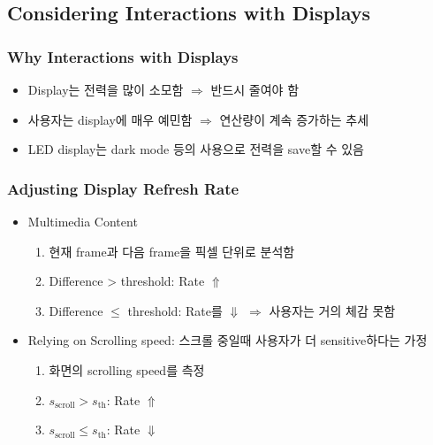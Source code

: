 \subsection{Considering Interactions with Displays}

\subsubsection*{Why Interactions with Displays}
\begin{itemize}
    \item Display는 전력을 많이 소모함 $\Rightarrow$ 반드시 줄여야 함
    \item 사용자는 display에 매우 예민함 $\Rightarrow$ 연산량이 계속 증가하는 추세
    \item LED display는 dark mode 등의 사용으로 전력을 save할 수 있음
\end{itemize}

\subsubsection*{Adjusting Display Refresh Rate}
\begin{itemize}
    \item Multimedia Content
    \begin{enumerate}
        \item 현재 frame과 다음 frame을 픽셀 단위로 분석함
        \item Difference > threshold: Rate $\Uparrow$
        \item Difference $\leq$ threshold: Rate를 $\Downarrow$ $\Rightarrow$ 사용자는 거의 체감 못함
    \end{enumerate}
    \item Relying on Scrolling speed: 스크롤 중일때 사용자가 더 sensitive하다는 가정
    \begin{enumerate}
        \item 화면의 scrolling speed를 측정
        \item $s_\mathrm{scroll} > s_\mathrm{th}$: Rate $\Uparrow$
        \item $s_\mathrm{scroll} \leq s_\mathrm{th}$: Rate $\Downarrow$
    \end{enumerate}
\end{itemize}

